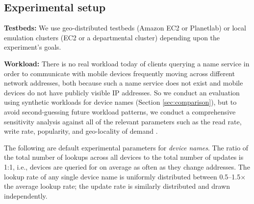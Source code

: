 \vspace{-0.1in}
\subsection{Experimental setup}

\textbf{Testbeds:} We use geo-distributed testbeds (Amazon EC2 or Planetlab) or local emulation clusters (EC2 or a departmental cluster) depending upon the experiment's goals. %


\textbf{Workload:} There is no real workload today of clients querying a name service in order to communicate with mobile devices frequently moving across different network addresses, both because such a name service does not exist and mobile devices do not have publicly visible IP addresses. So we conduct an evaluation using synthetic workloads for device names (Section \ref{sec:comparison}), but to avoid second-guessing future workload patterns, we conduct a comprehensive sensitivity analysis against all of the relevant parameters such as the read rate, write rate, popularity, and geo-locality of demand \cite{techreport}.


The following are default experimental parameters %
for {\em device names}. The ratio of the total number of lookups across all devices to the total number of updates is 1:1, i.e., devices are queried for on average as often as they change addresses. The lookup rate of any single device name is uniformly distributed between 0.5--1.5$\times$ the average lookup rate; the update rate is similarly distributed and drawn independently.%

